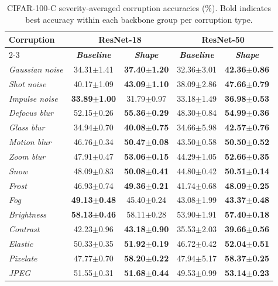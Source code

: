 \begin{table}[htbp]
\caption{CIFAR-100-C severity-averaged corruption accuracies (\%). Bold indicates best accuracy within each backbone group per corruption type.}
\begin{center}
\begin{tabular}{|l|c|c|c|c|}
\hline
\textbf{Corruption} & \multicolumn{2}{c|}{ResNet-18} & \multicolumn{2}{c|}{ResNet-50} \\
\cline{2-3} \cline{4-5}
 & \textbf{\textit{Baseline}} & \textbf{\textit{Shape}} & \textbf{\textit{Baseline}} & \textbf{\textit{Shape}} \\
\hline
\textit{Gaussian noise} & 34.31$\pm$1.41 & \textbf{37.40$\pm$1.20} & 32.36$\pm$3.01 & \textbf{42.36$\pm$0.86} \\
\textit{Shot noise} & 40.17$\pm$1.09 & \textbf{43.09$\pm$1.10} & 38.09$\pm$2.86 & \textbf{47.66$\pm$0.79} \\
\textit{Impulse noise} & \textbf{33.89$\pm$1.00} & 31.79$\pm$0.97 & 33.18$\pm$1.49 & \textbf{36.98$\pm$0.53} \\
\textit{Defocus blur} & 52.15$\pm$0.26 & \textbf{55.36$\pm$0.29} & 48.30$\pm$0.84 & \textbf{54.99$\pm$0.36} \\
\textit{Glass blur} & 34.94$\pm$0.70 & \textbf{40.08$\pm$0.75} & 34.66$\pm$5.98 & \textbf{42.57$\pm$0.76} \\
\textit{Motion blur} & 46.76$\pm$0.34 & \textbf{50.47$\pm$0.08} & 43.50$\pm$0.58 & \textbf{50.50$\pm$0.52} \\
\textit{Zoom blur} & 47.91$\pm$0.47 & \textbf{53.06$\pm$0.15} & 44.29$\pm$1.05 & \textbf{52.66$\pm$0.35} \\
\textit{Snow} & 48.09$\pm$0.83 & \textbf{50.08$\pm$0.41} & 44.80$\pm$0.42 & \textbf{50.51$\pm$0.14} \\
\textit{Frost} & 46.93$\pm$0.74 & \textbf{49.36$\pm$0.21} & 41.74$\pm$0.68 & \textbf{48.09$\pm$0.25} \\
\textit{Fog} & \textbf{49.13$\pm$0.48} & 45.40$\pm$0.24 & 43.08$\pm$1.99 & \textbf{43.37$\pm$0.48} \\
\textit{Brightness} & \textbf{58.13$\pm$0.46} & 58.11$\pm$0.28 & 53.90$\pm$1.91 & \textbf{57.40$\pm$0.18} \\
\textit{Contrast} & 42.23$\pm$0.96 & \textbf{43.18$\pm$0.90} & 35.53$\pm$2.03 & \textbf{39.66$\pm$0.56} \\
\textit{Elastic} & 50.33$\pm$0.35 & \textbf{51.92$\pm$0.19} & 46.72$\pm$0.42 & \textbf{52.04$\pm$0.51} \\
\textit{Pixelate} & 47.77$\pm$0.70 & \textbf{58.20$\pm$0.22} & 47.94$\pm$5.17 & \textbf{58.37$\pm$0.25} \\
\textit{JPEG} & 51.55$\pm$0.31 & \textbf{51.68$\pm$0.44} & 49.53$\pm$0.99 & \textbf{53.14$\pm$0.23} \\
\hline
\end{tabular}
\label{tab:cifar100_corruptions}
\end{center}
\end{table}